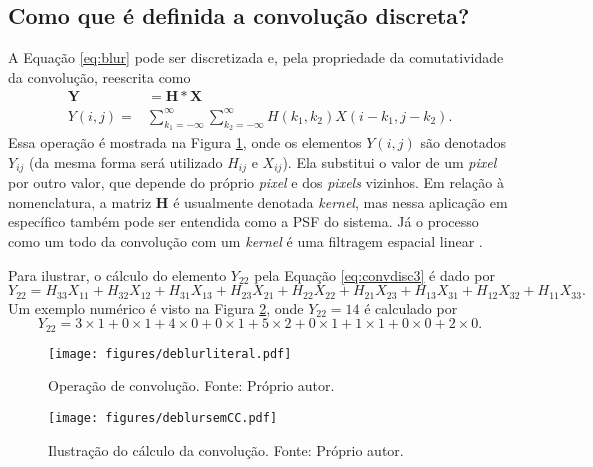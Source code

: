 \subsection{Como que é definida a convolução discreta?}
A Equação \eqref{eq:blur} pode ser discretizada e, pela propriedade da comutatividade da convolução, reescrita como
\begin{equation}
\begin{aligned}
\mathbf{Y}  & = \mathbf{H} * \mathbf{X} \\
Y(i,j) = & \sum_{k_1=-\infty}^{\infty} \sum_{k_2=-\infty}^{\infty} H(k_1,k_2) X(i-k_1,j-k_2).
\label{eq:convdisc3}
\end{aligned}
\end{equation}
Essa operação é mostrada na Figura \ref{deblur0}, onde os elementos $Y(i,j)$ são denotados $Y_{ij}$ (da mesma forma será utilizado $H_{ij}$ e $X_{ij}$). Ela substitui o valor de um \textit{pixel} por outro valor, que depende do próprio \textit{pixel} e dos \textit{pixels} vizinhos. Em relação à nomenclatura, a matriz $\mathbf{H}$ é usualmente denotada \textit{kernel}, mas nessa aplicação em específico também pode ser entendida como a PSF do sistema. Já o processo como um todo da convolução com um \textit{kernel} é uma filtragem espacial linear \cite[Subseção 3.4]{gonzalez2018}. 

 Para ilustrar, o cálculo do elemento $Y_{22}$ pela Equação \eqref{eq:convdisc3} é dado por
\begin{equation}
Y_{22} = H_{33} X_{11} + H_{32} X_{12} + H_{31} X_{13} + H_{23} X_{21} + H_{22} X_{22} + H_{21} X_{23} + H_{13} X_{31} + H_{12} X_{32} + H_{11} X_{33}.
\end{equation} 
Um exemplo numérico é visto na Figura \ref{fig:deblur1}, onde $Y_{22} = 14$ é calculado por
\begin{equation}
Y_{22} = 3 \times 1 + 0 \times1 + 4\times 0 + 0 \times1 + 5 \times2 + 0\times 1 + 1 \times1 + 0 \times0 + 2 \times0.
\end{equation}
\begin{figure}[H]
\centering
\texttt{[image: figures/deblurliteral.pdf]}
\caption[Operação de convolução.]{Operação de convolução. Fonte: Próprio autor.}
\label{deblur0}
\end{figure}


\begin{figure}[H]
\centering
\texttt{[image: figures/deblursemCC.pdf]}
\caption[Ilustração do cálculo da convolução.]{Ilustração do cálculo da convolução. Fonte: Próprio autor.}
\label{fig:deblur1}
\end{figure}

